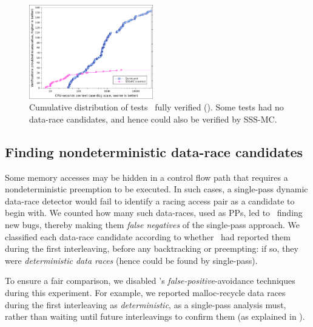 \begin{figure}[t]
	\includegraphics[width=0.48\textwidth]{totalverifs.pdf}
	\caption{Cumulative distribution of tests \quicksand~fully verified (\sect{\ref{sec:totalverif}}).
	Some tests had no data-race candidates, and hence could also be verified by SSS-MC.}
	\label{fig:totalverif}
\end{figure}





\subsection{Finding nondeterministic data-race candidates}
\label{sec:eval-falseneg}
Some memory accesses may be hidden in a control flow path that requires a nondeterministic preemption to be executed.
In such cases, a single-pass dynamic data-race detector
would fail
to identify a racing access pair as a candidate to begin with.
%
We counted how many such data-races, used as PPs, led to \quicksand~finding new bugs,
thereby making them {\em false negatives} of the single-pass approach.
We classified each data-race candidate according to whether \landslide~had reported them during the first interleaving, before any backtracking or preempting: if so, they were {\em deterministic data races} (hence could be found by single-pass).

To ensure a fair comparison, we disabled \landslide's {\em false-positive}-avoidance techniques during this experiment.
For example, we reported malloc-recycle data races during the first interleaving as {\em deterministic}, as a single-pass analysis must,
rather than waiting until future interleavings to confirm them (as explained in \sect{\ref{sec:recycle}}).

